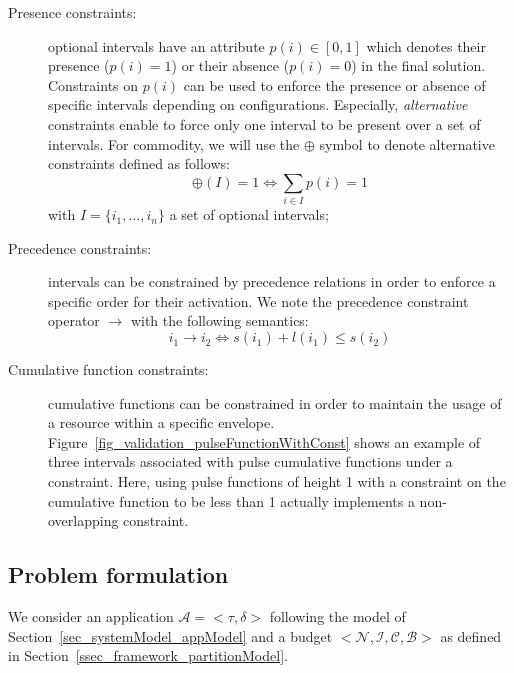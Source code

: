 \documentclass[main.tex]{subfiles}
\begin{document}
\begin{description}

    \item[Presence constraints: ] optional intervals have an attribute $p(i) \in [0,1]$ which denotes their presence ($p(i)=1$) or their absence ($p(i)=0$) in the final solution. Constraints on $p(i)$ can be used to enforce the presence or absence of specific intervals depending on configurations. Especially, \emph{alternative} constraints enable to force only one interval to be present over a set of intervals. For commodity, we will use the $\oplus$ symbol to denote alternative constraints defined as follows:
        \begin{displaymath}
            \oplus(I)=1 \Leftrightarrow \underset{i \in I}{\sum} p(i) = 1
        \end{displaymath}
        with $I =  \{ i_1 , \ldots , i_n \}$ a set of optional intervals;

    \item[Precedence constraints: ] intervals can be constrained by precedence relations in order to enforce a specific order for their activation. We note the precedence constraint operator $ \to $ with the following semantics:
        \begin{displaymath}
            i_1 \to i_2 \Leftrightarrow s(i_1) + l(i_1) \leq s(i_2)
        \end{displaymath}

    \item[Cumulative function constraints: ] cumulative functions can be constrained in order to maintain the usage of a resource within a specific envelope. Figure~\ref{fig_validation_pulseFunctionWithConst} shows an example of three intervals associated with pulse cumulative functions under a constraint. Here, using pulse functions of height 1 with a constraint on the cumulative function to be less than 1 actually implements a non-overlapping constraint.

\end{description}

\subsection{Problem formulation}
We consider an application $\mathcal{A} = <\tau , \delta>$ following the model of Section~\ref{sec_systemModel_appModel} and a budget $<\mathcal{N} , \mathcal{I} , \mathcal{C} , \mathcal{B} > $ as defined in Section~\ref{ssec_framework_partitionModel}.
\end{document}
